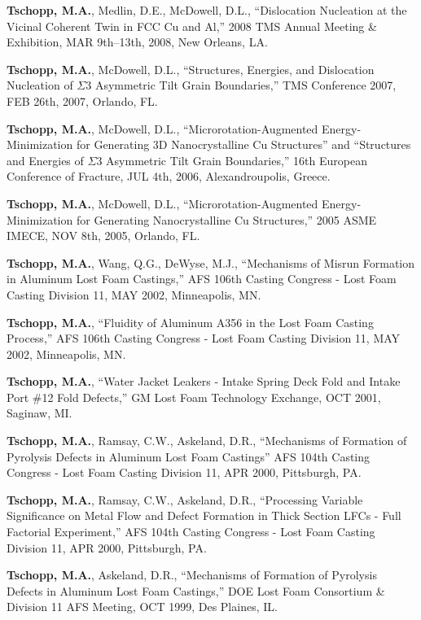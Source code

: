 \begin{cvlist}
\item
\textbf{Tschopp, M.A.}, Medlin, D.E., McDowell, D.L., ``Dislocation Nucleation at the Vicinal Coherent Twin in FCC Cu and Al,'' 2008 TMS Annual Meeting \& Exhibition, MAR 9th--13th, 2008, New Orleans, LA.

\item
\textbf{Tschopp, M.A.}, McDowell, D.L., ``Structures, Energies, and Dislocation Nucleation of $\Sigma3$ Asymmetric Tilt Grain Boundaries,'' TMS Conference 2007, FEB 26th, 2007, Orlando, FL.

\item
\textbf{Tschopp, M.A.}, McDowell, D.L., ``Microrotation-Augmented Energy-Minimization for Generating 3D Nanocrystalline Cu Structures'' and ``Structures and Energies of $\Sigma3$ Asymmetric Tilt Grain Boundaries,''  16th European Conference of Fracture, JUL 4th, 2006, Alexandroupolis, Greece.

\item
\textbf{Tschopp, M.A.}, McDowell, D.L., ``Microrotation-Augmented Energy-Minimization for Generating Nanocrystalline Cu Structures,''  2005 ASME IMECE, NOV 8th, 2005, Orlando, FL.

\item
\textbf{Tschopp, M.A.}, Wang, Q.G., DeWyse, M.J., ``Mechanisms of Misrun Formation in Aluminum Lost Foam Castings,''  AFS 106th Casting Congress - Lost Foam Casting Division 11, MAY 2002, Minneapolis, MN.

\item
\textbf{Tschopp, M.A.}, ``Fluidity of Aluminum A356 in the Lost Foam Casting Process,''  AFS 106th Casting Congress - Lost Foam Casting Division 11, MAY 2002, Minneapolis, MN.

\item
\textbf{Tschopp, M.A.}, ``Water Jacket Leakers - Intake Spring Deck Fold and Intake Port \#12 Fold Defects,''  GM Lost Foam Technology Exchange, OCT 2001, Saginaw, MI.

\item
\textbf{Tschopp, M.A.}, Ramsay, C.W., Askeland, D.R., ``Mechanisms of Formation of Pyrolysis Defects in Aluminum Lost Foam Castings''  AFS 104th Casting Congress - Lost Foam Casting Division 11, APR 2000, Pittsburgh, PA.

\item
\textbf{Tschopp, M.A.}, Ramsay, C.W., Askeland, D.R., ``Processing Variable Significance on Metal Flow and Defect Formation in Thick Section LFCs - Full Factorial Experiment,''  AFS 104th Casting Congress - Lost Foam Casting Division 11, APR 2000, Pittsburgh, PA.

\item
\textbf{Tschopp, M.A.}, Askeland, D.R., ``Mechanisms of Formation of Pyrolysis Defects in Aluminum Lost Foam Castings,''  DOE Lost Foam Consortium \& Division 11 AFS Meeting, OCT 1999, Des Plaines, IL.

\end{cvlist}

